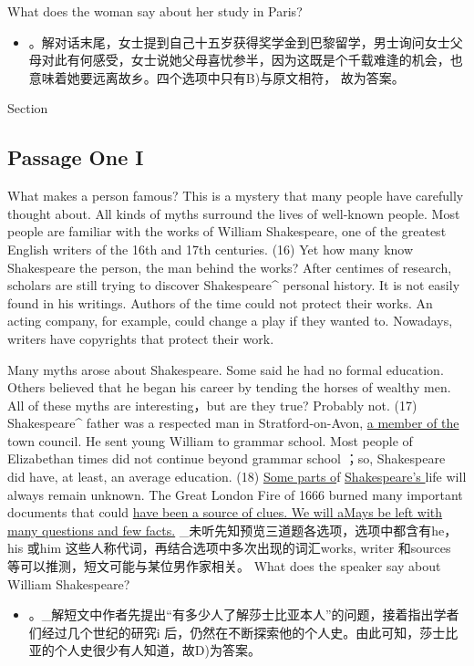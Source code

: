 \documentclass[UTF8,11pt]{ctexart}
\begin{document}
What does the woman say about her study in Paris?


\begin{itemize}[leftmargin=2em,itemsep=.2em,topsep=.4em]\item[B.] 。解对话末尾，女士提到自己十五岁获得奖学金到巴黎留学，男士询问女士父母对此有何感受，女士说她父母喜忧参半，因为这既是个千载难逢的机会，也意味着她要远离故乡。四个选项中只有B)与原文相符， 故为答案。
\end{itemize}

Section


\subsection*{Passage One I}


What makes a person famous? This is a mystery that many people have carefully thought about. All kinds of myths surround the lives of well-known people. Most people are familiar with the works of William Shakespeare, one of the greatest English writers of the 16th and 17th centuries. (16) Yet how many know Shakespeare the person, the man behind the works? After centimes of research, scholars are still trying to discover Shakespeare\textasciicircum{} personal history. It is not easily found in his writings. Authors of the time could not protect their works. An acting company, for example, could change a play if they wanted to. Nowadays, writers have copyrights that protect their work.


Many myths arose about Shakespeare. Some said he had no formal education. Others believed that he began his career by tending the horses of wealthy men. All of these myths are interesting，but are they true? Probably not. (17) Shakespeare\textasciicircum{} father was a respected man in Stratford-on-Avon, \uline{a member of the} town council. He sent young William to grammar school. Most people of Elizabethan times did not continue beyond grammar school ；so, Shakespeare did have, at least, an average education. (18) \uline{Some parts o}f \uline{Shakespeare’s }life will always remain unknown. The Great London Fire of 1666 burned many important documents that could \uline{have been a source of clues. We will aMays be left with many questions and few facts.} \_未听先知预览三道题各选项，选项中都含有he，his 或him 这些人称代词，再结合选项中多次出现的词汇works, writer 和sources 等可以推测，短文可能与某位男作家相关。 What does the speaker say about William Shakespeare?


\begin{itemize}[leftmargin=2em,itemsep=.2em,topsep=.4em]\item[D.] 。\_解短文中作者先提出“有多少人了解莎士比亚本人”的问题，接着指出学者们经过几个世纪的研究i 后，仍然在不断探索他的个人史。由此可知，莎士比亚的个人史很少有人知道，故D)为答案。
\end{itemize}
\end{document}
